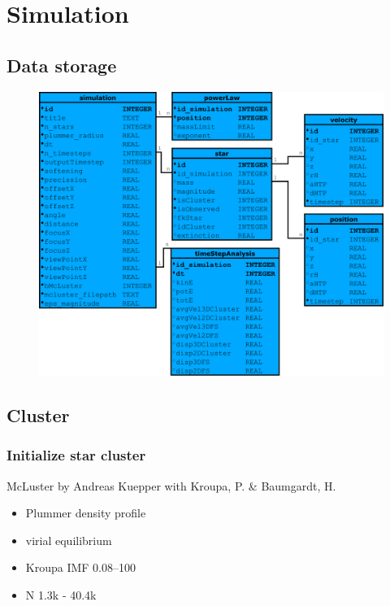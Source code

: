 \documentclass{beamer}
\begin{document}
\section{Simulation}

\subsection{Data storage}

\begin{frame}
\begin{figure}
\centering
\includegraphics[width=\textwidth,height=0.8\textheight,keepaspectratio]{Images/ERD.pdf}
\end{figure}
\end{frame}


\subsection{Cluster}

\begin{frame}
\frametitle{Initialize star cluster}
McLuster by Andreas Kuepper with Kroupa, P. \& Baumgardt, H.
\\[2ex]
\begin{itemize}
\item<1-> Plummer density profile
\item<2-> virial equilibrium
\item<3-> Kroupa IMF \SIrange{0.08}{100}{\solarmass}
\item<4-> N 1.3k - 40.4k
\end{itemize}

\end{frame}
\end{document}
